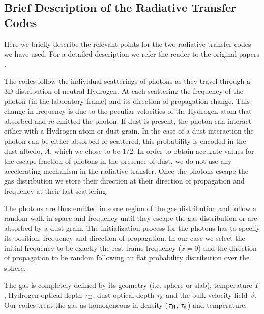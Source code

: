 \documentclass{emulateapj}
\newcommand{\ly}{{\ifmmode{{\rm Ly}\alpha~}\else{Ly$\alpha$~}\fi}}
\begin{document}
\subsection{Brief Description of the Radiative Transfer Codes}

Here we briefly describe the relevant points for the two radiative
transfer codes we have used. For a detailed description we refer the
reader to the original papers \cite{CLARA,DijkstraKramer}.

The codes follow the individual scatterings of \ly photons as they
travel through a 3D distribution of neutral Hydrogen. At each
scattering the frequency of the photon (in the laboratory frame) and
its direction of propagation change. This change in frequency is due
to the peculiar velocities of the Hydrogen atom that absorbed and
re-emitted the photon. If dust is present, the photon can interact
either with a Hydrogen atom or dust grain. In the case of a dust
interaction the photon can be either absorbed or scattered, this
probability is encoded in the dust albedo, $A$, which we chose to be
$1/2$. In order to obtain accurate values for the escape fraction of
photons in the presence of dust, we do not use any accelerating
mechanism in the radiative transfer. Once the photons escape the gas
distribution we store their direction at their direction of
propagation and frequency at their last scattering.

The photons are thus emitted in some region of the gas distribution
and follow a random walk in space and frequency until they escape the
gas distribution or are absorbed by a dust grain. The initialization
process for the \ly photons has to specify its position, frequency and
direction of propagation. In our case we select the initial frequency
to be exactly the \ly rest-frame frequency ($x=0$) and the direction of
propagation to be random following an flat probability distribution
over the sphere.


The gas is completely defined by its geometry (i.e. sphere or slab),
temperature $T$, Hydrogen optical depth $\tau_{\rm H}$, dust optical
depth $\tau_{\rm a}$ and the bulk velocity field $\vec{v}$. Our codes
treat the gas as homogeneous in density ($\tau_{\rm H}$, $\tau_{\rm
  a}$) and temperature.  
\end{document}
